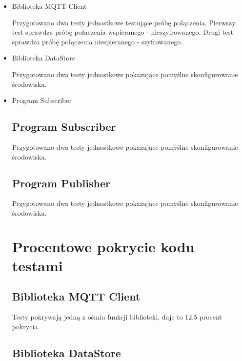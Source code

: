 \documentclass[a4paper,titlepage,11pt,twosides,floatssmall]{mwrep}
\begin{document}
\begin{itemize}
	\item Biblioteka MQTT Client

Przygotowano dwa testy jednostkowe testujące próbę połączenia. 
\newline
Pierwszy test sprawdza próbę połaczenia wspieranego - nieszyfrowanego.
\newline
Drugi test sprawdza próbę połączenia niespieranego - szyfrowanego.

	\item Biblioteka DataStore

Przygotowano dwa testy jednostkowe pokazujące pomyślne skonfigurowanie środowiska.

	\item Program Subscriber
\subsection{Program Subscriber}

Przygotowano dwa testy jednostkowe pokazujące pomyślne skonfigurowanie środowiska.

\subsection{Program Publisher}

Przygotowano dwa testy jednostkowe pokazujące pomyślne skonfigurowanie środowiska.


\section{Procentowe pokrycie kodu testami}

\subsection{Biblioteka MQTT Client}

Testy pokrywają jedną z ośmiu funkcji biblioteki, daje to \num{12.5} procent pokrycia.

\subsection{Biblioteka DataStore}


\end{itemize}
\end{document}
